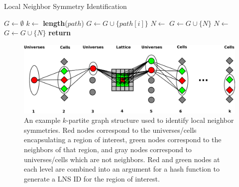 \begin{algorithm}[h!]
\caption[OpenCG's Local Neighbor Symmetry Identification]{Local Neighbor Symmetry Identification}
\label{alg:local-neighbor-symmetry-cells}
\begin{algorithmic}[1]
    \State $G \gets \emptyset$ 
    \State $k \gets$ \textbf{length}($path$) 
            \State $G \gets G \cup \{path[i]\}$ 
            \State $N \gets$  
            \State $G \gets G \cup \{N\}$ 
            \State $N \gets$  
            \State $G \gets G \cup \{N\}$ 
        \EndIf
    \EndFor
    \State \textbf{return}  
\EndProcedure
\end{algorithmic}
\end{algorithm}

\begin{figure}[h!]
  \centering
  \includegraphics[width=\linewidth]{figures/workflow/opencg/neighbors-k-partite-graph}
  \caption[A $k$-partite graph created by the OpenCG LNS algorithm]{An example $k$-partite graph structure used to identify local neighbor symmetries. Red nodes correspond to the universes/cells encapsulating a region of interest, green nodes correspond to the neighbors of that region, and gray nodes correspond to universes/cells which are not neighbors. Red and green nodes at each level are combined into an argument for a hash function to generate a \ac{LNS} ID for the region of interest.}
  \label{fig:lns-k-partite-graph}
\end{figure}

